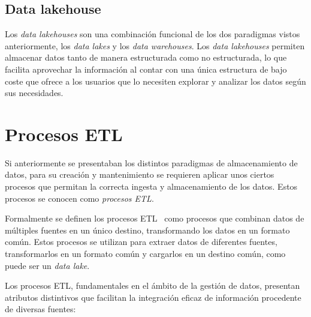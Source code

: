 \subsection{Data lakehouse}\label{sec:lakehouse}
Los \textit{data lakehouses} son una combinación funcional de los dos paradigmas
vistos anteriormente, los \textit{data lakes} y los \textit{data warehouses}.
Los \textit{data lakehouses} permiten almacenar datos tanto de manera
estructurada como no estructurada, lo que facilita aprovechar la información al
contar con una única estructura de bajo coste que ofrece a los usuarios que lo
necesiten explorar y analizar los datos según sus necesidades.


\newpage{}
\section{Procesos ETL}\label{sec:etl}
Si anteriormente se presentaban los distintos paradigmas de almacenamiento de
datos, para su creación y mantenimiento se requieren aplicar unos ciertos
procesos que permitan la correcta ingesta y almacenamiento de los datos. Estos
procesos se conocen como \textit{procesos ETL}.

Formalmente se definen los procesos ETL~\cite{mier2023dashboards} como procesos
que combinan datos de múltiples fuentes en un único destino, transformando los
datos en un formato común. Estos procesos se utilizan para extraer datos de
diferentes fuentes, transformarlos en un formato común y cargarlos en un destino
común, como puede ser un \textit{data lake}.

Los procesos ETL, fundamentales en el ámbito de la gestión de datos, presentan
atributos distintivos que facilitan la integración eficaz de información
procedente de diversas fuentes:

